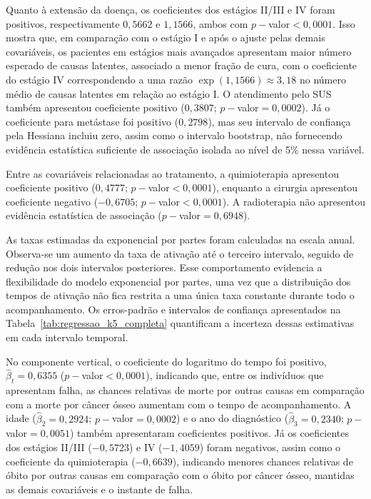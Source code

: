 \documentclass[11pt,a4paper]{article}
\begin{document}
Quanto à extensão da doença, os coeficientes dos estágios II/III e IV foram positivos, respectivamente $0{,}5662$ e $1{,}1566$, ambos com $p-$valor$<0{,}0001$. Isso mostra que, em comparação com o estágio I e após o ajuste pelas demais covariáveis, os pacientes em estágios mais avançados apresentam maior número esperado de causas latentes, associado a menor fração de cura, com o coeficiente do estágio IV correspondendo a uma razão $\exp(1{,}1566)\approx3{,}18$ no número médio de causas latentes em relação ao estágio I. O atendimento pelo SUS também apresentou coeficiente positivo ($0{,}3807$; $p-$valor$=0{,}0002$). Já o coeficiente para metástase foi positivo ($0{,}2798$), mas seu intervalo de confiança pela Hessiana incluiu zero, assim como o intervalo bootstrap, não fornecendo evidência estatística suficiente de associação isolada ao nível de 5\% nessa variável.

Entre as covariáveis relacionadas ao tratamento, a quimioterapia apresentou coeficiente positivo ($0{,}4777$; $p-$valor$<0{,}0001$), enquanto a cirurgia apresentou coeficiente negativo ($-0{,}6705$; $p-$valor$<0{,}0001$). A radioterapia não apresentou evidência estatística de associação ($p-$valor$=0{,}6948$). 

As taxas estimadas da exponencial por partes foram calculadas na escala anual. Observa-se um aumento da taxa de ativação até o terceiro intervalo, seguido de redução nos dois intervalos posteriores. Esse comportamento evidencia a flexibilidade do modelo exponencial por partes, uma vez que a distribuição dos tempos de ativação não fica restrita a uma única taxa constante durante todo o acompanhamento. Os erros-padrão e intervalos de confiança apresentados na Tabela~\ref{tab:regressao_k5_completa} quantificam a incerteza dessas estimativas em cada intervalo temporal.

No componente vertical, o coeficiente do logaritmo do tempo foi positivo, $\widehat\beta_t=0{,}6355$ ($p-$valor$<0{,}0001$), indicando que, entre os indivíduos que apresentam falha, as chances relativas de morte por outras causas em comparação com a morte por câncer ósseo aumentam com o tempo de acompanhamento. A idade ($\widehat\beta_2=0{,}2924$; $p-$valor$=0{,}0002$) e o ano do diagnóstico ($\widehat\beta_3=0{,}2340$; $p-$valor$=0{,}0051$) também apresentaram coeficientes positivos. Já os coeficientes dos estágios II/III ($-0{,}5723$) e IV ($-1{,}4059$) foram negativos, assim como o coeficiente da quimioterapia ($-0{,}6639$), indicando menores chances relativas de óbito por outras causas em comparação com o óbito por câncer ósseo, mantidas as demais covariáveis e o instante de falha. 
\end{document}
